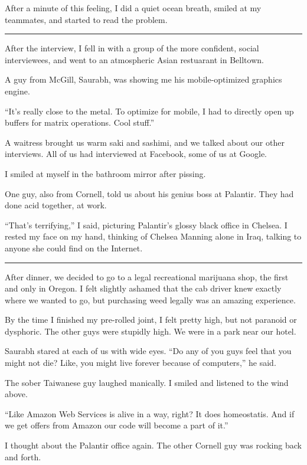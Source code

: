 After a minute of this feeling, I did a quiet ocean breath, smiled at my
teammates, and started to read the problem.

\plainfancybreak{12pt}{2}{* * *}

After the interview, I fell in with a group of the more confident, social
interviewees, and went to an atmospheric Asian restuarant in Belltown.

A guy from McGill, Saurabh, was showing me his mobile-optimized graphics engine.

``It's really close to the metal.  To optimize for mobile, I had to directly
open up buffers for matrix operations.  Cool stuff.''

A waitress brought us warm saki and sashimi, and we talked about our other
interviews.  All of us had interviewed at Facebook, some of us at Google.  

I smiled at myself in the bathroom mirror after pissing.

One guy, also from Cornell, told us about his genius boss at Palantir.  They had
done acid together, at work.

``That's terrifying,'' I said, picturing Palantir's glossy black office in
Chelsea.  I rested my face on my hand, thinking of Chelsea Manning alone in
Iraq, talking to anyone she could find on the Internet.

\plainfancybreak{12pt}{2}{* * *}

After dinner, we decided to go to a legal recreational marijuana shop, the first
and only in Oregon.  I felt slightly ashamed that the cab driver knew exactly
where we wanted to go, but purchasing weed legally was an amazing experience.

By the time I finished my pre-rolled joint, I felt pretty high, but not paranoid or
dysphoric.  The other guys were stupidly high.  We were in a park near our
hotel.

Saurabh stared at each of us with wide eyes.  ``Do any of you guys feel that you
might not die?  Like, you might live forever because of computers,'' he said.

The sober Taiwanese guy laughed manically.  I smiled and listened to the wind
above.

``Like Amazon Web Services is alive in a way, right?  It does homeostatis.  And
if we get offers from Amazon our code will become a part of it.''

I thought about the Palantir office again.  The other Cornell guy was rocking
back and forth.

